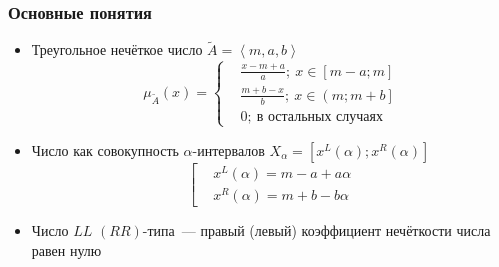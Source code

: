 \documentclass[12pt]{beamer}
\begin{document}
\begin{frame}
  \frametitle{Основные понятия}
  \begin{itemize}
    \item Треугольное нечёткое число $\tilde A = \left\langle m,a,b \right\rangle $
      \begin{equation}
        \mu_{\tilde A}\left( x \right)=
        \left\{ \begin{aligned}
			& \frac{x-m+a}{a};\ x\in \left[ m-a;m \right] \\ 
			& \frac{m+b-x}{b};\ x\in \left( m;m+b \right] \\ 
			& 0;\ \text{в остальных случаях} 
	 	\end{aligned} \right.
      \end{equation}
    \item Число как совокупность $\alpha$-интервалов $X_\alpha = \left[x^L(\alpha); x^R(\alpha) \right]$
      \begin{equation}
        \left[ 
          \begin{aligned}
            & x^L(\alpha )=m-a+a\alpha  \\ 
            & x^R(\alpha )=m+b-b\alpha
          \end{aligned}
        \right.
      \end{equation}
    \item Число $LL$ $\left( RR \right)$-типа~--- правый (левый) коэффициент нечёткости числа равен нулю
  \end{itemize}
\end{frame}

\end{document}
